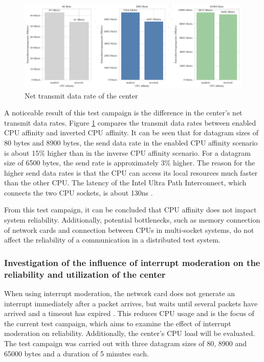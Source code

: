 \documentclass[11pt]{article}
\begin{document}
\begin{figure}[h]
	\includegraphics[width=\textwidth]{fig9.png}
	\centering
	\caption{Net transmit data rate of the center}
    \label{fig:fig9}
\end{figure}

A noticeable result of this test campaign is the difference in the center's net transmit data rates. Figure \ref{fig:fig9} compares the transmit data rates between enabled CPU affinity and inverted CPU affinity. It can be seen that for datagram sizes of 80 bytes and 8900 bytes, the send data rate in the enabled CPU affinity scenario is about 15\% higher than in the inverse CPU affinity scenario. For a datagram size of 6500 bytes, the send rate is approximately 3\% higher. The reason for the higher send data rates is that the CPU can access its local resources much faster than the other CPU. The latency of the Intel Ultra Path Interconnect, which connects the two CPU sockets, is about 130ns \cite{tbd}.

From this test campaign, it can be concluded that CPU affinity does not impact system reliability. Additionally, potential bottlenecks, such as memory connection of network cards and connection between CPUs in multi-socket systems, do not affect the reliability of a communication in a distributed test system.


\subsubsection{Investigation of the influence of interrupt moderation on the reliability and utilization of the center}

When using interrupt moderation, the network card does not generate an interrupt immediately after a packet arrives, but waits until several packets have arrived and a timeout has expired \cite{tbd}. This reduces CPU usage and is the focus of the current test campaign, which aims to examine the effect of interrupt moderation on reliability. Additionally, the center's CPU load will be evaluated. The test campaign was carried out with three datagram sizes of 80, 8900 and 65000 bytes and a duration of 5 minutes each.
\end{document}
